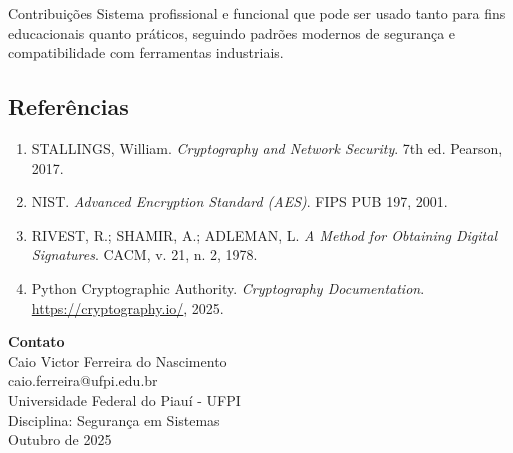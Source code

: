 \documentclass[12pt,a4paper]{article}
\begin{document}
\begin{successbox}{Contribuições}
Sistema profissional e funcional que pode ser usado tanto para fins educacionais quanto práticos, seguindo padrões modernos de segurança e compatibilidade com ferramentas industriais.
\end{successbox}

\subsection{Referências}

\begin{enumerate}
    \item STALLINGS, William. \textit{Cryptography and Network Security}. 7th ed. Pearson, 2017.
    \item NIST. \textit{Advanced Encryption Standard (AES)}. FIPS PUB 197, 2001.
    \item RIVEST, R.; SHAMIR, A.; ADLEMAN, L. \textit{A Method for Obtaining Digital Signatures}. CACM, v. 21, n. 2, 1978.
    \item Python Cryptographic Authority. \textit{Cryptography Documentation}. \url{https://cryptography.io/}, 2025.
\end{enumerate}

\begin{center}
\begin{tcolorbox}[width=0.85\textwidth,colback=primaryblue!10,colframe=primaryblue]
\textbf{Contato}\\
Caio Victor Ferreira do Nascimento\\
caio.ferreira@ufpi.edu.br\\
Universidade Federal do Piauí - UFPI\\
Disciplina: Segurança em Sistemas\\
Outubro de 2025
\end{tcolorbox}
\end{center}
\end{document}
